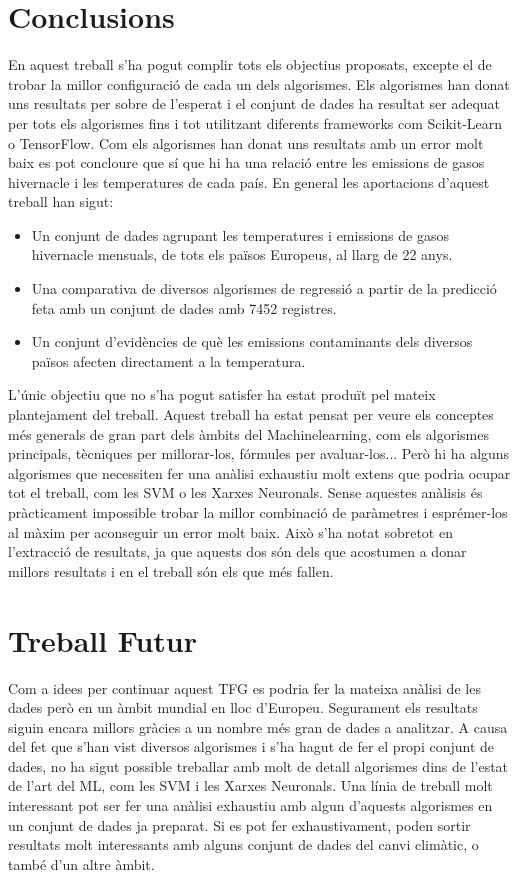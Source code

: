 \documentclass[10pt,a4paper,twocolumn,twoside]{article}
\begin{document}
\section {Conclusions}
En aquest treball s'ha pogut complir tots els objectius proposats, excepte el de trobar la millor configuració de cada un dels algorismes. Els algorismes han donat uns resultats per sobre de l'esperat i el conjunt de dades ha resultat ser adequat per tots els algorismes fins i tot utilitzant diferents frameworks com Scikit-Learn o TensorFlow. Com els algorismes han donat uns resultats amb un error molt baix es pot concloure que sí que hi ha una relació entre les emissions de gasos hivernacle i les temperatures de cada país. En general les aportacions d'aquest treball han sigut:
\begin{itemize}
\item Un conjunt de dades agrupant les temperatures i emissions de gasos hivernacle mensuals, de tots els països Europeus, al llarg de 22 anys.
\item Una comparativa de diversos algorismes de regressió a partir de la predicció feta amb un conjunt de dades amb 7452 registres.
\item Un conjunt d'evidències de què les emissions contaminants dels diversos països afecten directament a la temperatura.
\end{itemize}
L'únic objectiu que no s'ha pogut satisfer ha estat produït pel mateix plantejament del treball. Aquest treball ha estat pensat per veure els conceptes més generals de gran part dels àmbits del Machinelearning, com els algorismes principals, tècniques per millorar-los, fórmules per avaluar-los... Però hi ha alguns algorismes que necessiten fer una anàlisi exhaustiu molt extens que podria ocupar tot el treball, com les SVM o les Xarxes Neuronals. Sense aquestes anàlisis és pràcticament impossible trobar la millor combinació de paràmetres i esprémer-los al màxim per aconseguir un error molt baix. Això s'ha notat sobretot en l'extracció de resultats, ja que aquests dos són dels que acostumen a donar millors resultats i en el treball són els que més fallen.

\section{Treball Futur}
Com a idees per continuar aquest TFG es podria fer la mateixa anàlisi de les dades però en un àmbit mundial en lloc d'Europeu. Segurament els resultats siguin encara millors gràcies a un nombre més gran de dades a analitzar. A causa del fet que s'han vist diversos algorismes i s'ha hagut de fer el propi conjunt de dades, no ha sigut possible treballar amb molt de detall algorismes dins de l'estat de l'art del ML, com les SVM i les Xarxes Neuronals. Una línia de treball molt interessant pot ser fer una anàlisi exhaustiu amb algun d'aquests algorismes en un conjunt de dades ja preparat. Si es pot fer exhaustivament, poden sortir resultats molt interessants amb alguns conjunt de dades del canvi climàtic, o també d'un altre àmbit.
\end{document}
